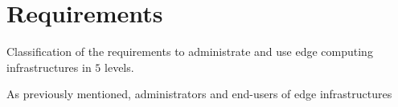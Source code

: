 
\section{Requirements}
\label{sec:requirements}

%   


\begin{table*}
    \centering
        
    \caption{Classification of the requirements to administrate and use edge
    computing infrastructures in $5$ levels.}
    \label{tab:requirements}
\end{table*}


As previously mentioned, administrators and end-users of edge infrastructures


